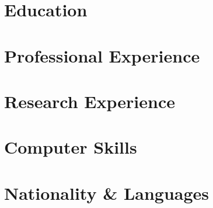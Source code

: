 \documentclass{resume}
\begin{document}
    

\section{Education}
    
    

\section{Professional Experience}
    

\section{Research Experience}
    


\section{Computer Skills}
    
    
\section{Nationality \& Languages}
	
\end{document}
